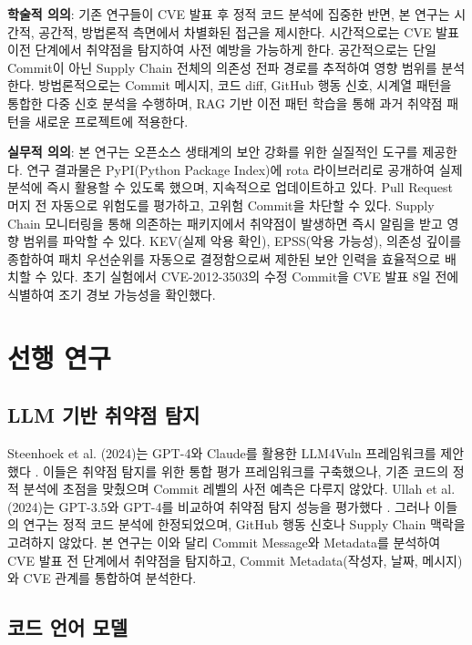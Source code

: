 ﻿\documentclass[conference]{IEEEtran}
\begin{document}
\textbf{학술적 의의}: 기존 연구들이 CVE 발표 후 정적 코드 분석에 집중한 반면, 본 연구는 시간적, 공간적, 방법론적 측면에서 차별화된 접근을 제시한다. 시간적으로는 CVE 발표 이전 단계에서 취약점을 탐지하여 사전 예방을 가능하게 한다. 공간적으로는 단일 Commit이 아닌 Supply Chain 전체의 의존성 전파 경로를 추적하여 영향 범위를 분석한다. 방법론적으로는 Commit 메시지, 코드 diff, GitHub 행동 신호, 시계열 패턴을 통합한 다중 신호 분석을 수행하며, RAG 기반 이전 패턴 학습을 통해 과거 취약점 패턴을 새로운 프로젝트에 적용한다.

\textbf{실무적 의의}: 본 연구는 오픈소스 생태계의 보안 강화를 위한 실질적인 도구를 제공한다. 연구 결과물은 PyPI(Python Package Index)에 rota 라이브러리로 공개하여 실제 분석에 즉시 활용할 수 있도록 했으며, 지속적으로 업데이트하고 있다. Pull Request 머지 전 자동으로 위험도를 평가하고, 고위험 Commit을 차단할 수 있다. Supply Chain 모니터링을 통해 의존하는 패키지에서 취약점이 발생하면 즉시 알림을 받고 영향 범위를 파악할 수 있다. KEV(실제 악용 확인), EPSS(악용 가능성), 의존성 깊이를 종합하여 패치 우선순위를 자동으로 결정함으로써 제한된 보안 인력을 효율적으로 배치할 수 있다. 초기 실험에서 CVE-2012-3503의 수정 Commit을 CVE 발표 8일 전에 식별하여 조기 경보 가능성을 확인했다.


\section{선행 연구}

\subsection{LLM 기반 취약점 탐지}

Steenhoek et al. (2024)는 GPT-4와 Claude를 활용한 LLM4Vuln 프레임워크를 제안했다 \cite{steenhoek2024}. 이들은 취약점 탐지를 위한 통합 평가 프레임워크를 구축했으나, 기존 코드의 정적 분석에 초점을 맞췄으며 Commit 레벨의 사전 예측은 다루지 않았다. Ullah et al. (2024)는 GPT-3.5와 GPT-4를 비교하여 취약점 탐지 성능을 평가했다 \cite{ullah2024}. 그러나 이들의 연구는 정적 코드 분석에 한정되었으며, GitHub 행동 신호나 Supply Chain 맥락을 고려하지 않았다. 본 연구는 이와 달리 Commit Message와 Metadata를 분석하여 CVE 발표 전 단계에서 취약점을 탐지하고, Commit Metadata(작성자, 날짜, 메시지)와 CVE 관계를 통합하여 분석한다.

\subsection{코드 언어 모델}
\end{document}
